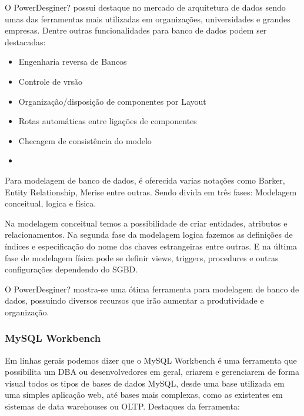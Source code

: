 \documentclass[12pt,a4paper]{article}
\begin{document}
			O PowerDesginer? possui destaque no mercado de arquitetura de dados sendo umas das ferramentas mais utilizadas em
			organizações, universidades e grandes empresas. Dentre outras funcionalidades para banco de dados podem ser
			destacadas:
			\begin{itemize}
			  \item Engenharia reversa de Bancos
			  \item Controle de vrsão
			  \item Organização/disposição de componentes por Layout
			  \item Rotas automáticas entre ligações de componentes
			  \item Checagem de consistência do modelo
			  \item
			\end{itemize}
			
			Para modelagem de banco de dados, é oferecida varias notações como Barker, Entity Relationship, Merise entre outras.
			Sendo divida em três fases: Modelagem conceitual, logica e física.

			Na modelagem conceitual temos a possibilidade de criar entidades, atributos e relacionamentos. Na segunda fase da
			modelagem logica fazemos as definições de índices e especificação do nome das chaves estrangeiras entre outras. E na
			última fase de modelagem física pode se definir views, triggers, procedures e outras configurações dependendo do SGBD.

			O PowerDesginer? mostra-se uma ótima ferramenta para modelagem de banco de dados, possuindo diversos recursos que
			irão aumentar a produtividade e organização.
			
		\subsubsection{MySQL Workbench}
		
			Em linhas gerais podemos dizer que o MySQL Workbench é uma ferramenta que possibilita um DBA ou desenvolvedores em
			geral, criarem e gerenciarem de forma visual todos os tipos de bases de dados MySQL, desde uma base utilizada em uma
			simples aplicação web, até bases mais complexas, como as existentes em sistemas de data warehouses ou OLTP. Destaques
			da ferramenta:
			
\end{document}

